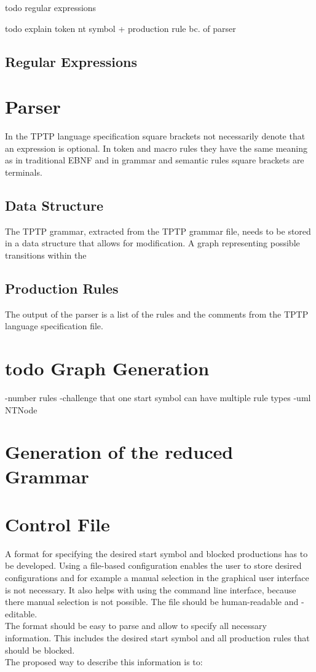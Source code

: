todo regular expressions
 
todo explain token nt symbol + production rule bc. of parser
\subsection{Regular Expressions}\label{sec:ConceptRegularExpressions}

\section{Parser}\label{ConceptParser}


In the \ac{TPTP} language specification square brackets not necessarily denote that an expression is optional.
In token and macro rules they have the same meaning as in traditional \ac{EBNF} and in grammar and semantic rules square brackets are terminals.
\subsection{Data Structure}
The \ac{TPTP} grammar, extracted from the \ac{TPTP} grammar file, needs to be stored in a data structure that allows for modification.
A graph representing possible transitions within the 

\subsection{Production Rules}


The output of the parser is a list of the rules and the comments from the \ac{TPTP} language specification file.
\section{todo Graph Generation}\label{sec:ConceptGraphGeneration}
-number rules
-challenge that one start symbol can have multiple rule types
-uml NTNode
\section{Generation of the reduced Grammar}\label{sec:ConceptGenerateReducedGrammar}

\section{Control File}\label{sec:ConceptControlFile}
A format for specifying the desired start symbol and blocked productions has to be developed.
Using a file-based configuration enables the user to store desired configurations and for example a manual selection in the graphical user interface is not necessary.
It also helps with using the command line interface, because there manual selection is not possible.
The file should be human-readable and -editable.\\
The format should be easy to parse and allow to specify all necessary information.
This includes the desired start symbol and all production rules that should be blocked.\\
The proposed way to describe this information is to:

